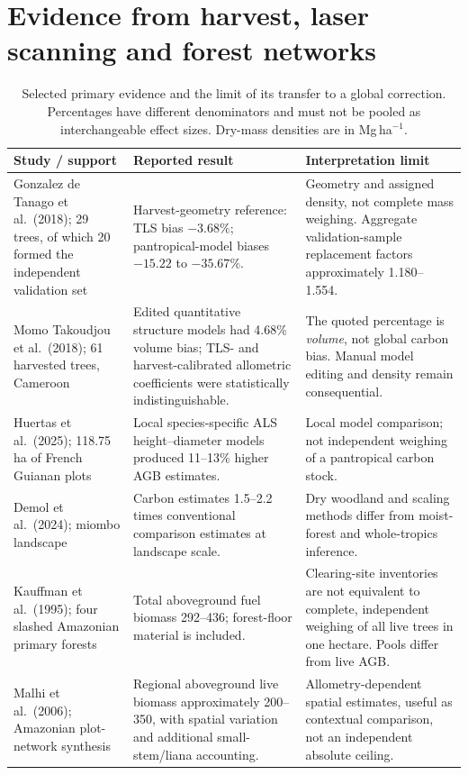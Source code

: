 \documentclass[11pt,a4paper]{article}
\theoremstyle{remark}
\begin{document}
\section{Evidence from harvest, laser scanning and forest networks}
\begin{table}[p]
\centering\small
\caption{Selected primary evidence and the limit of its transfer to a global correction. Percentages have different denominators and must not be pooled as interchangeable effect sizes. Dry-mass densities are in Mg\,ha$^{-1}$.}
\label{tab:evidence}
\begin{tabularx}{\textwidth}{@{}p{}p{}Y@{}}
\toprule
Study / support & Reported result & Interpretation limit\\
\midrule
Gonzalez de Tanago et al.\ (2018); 29 trees, of which 20 formed the independent validation set & Harvest-geometry reference: TLS bias $-3.68\%$; pantropical-model biases $-15.22$ to $-35.67\%$. & Geometry and assigned density, not complete mass weighing. Aggregate validation-sample replacement factors approximately 1.180--1.554.\\[.6em]
Momo Takoudjou et al.\ (2018); 61 harvested trees, Cameroon & Edited quantitative structure models had 4.68\% volume bias; TLS- and harvest-calibrated allometric coefficients were statistically indistinguishable. & The quoted percentage is \emph{volume}, not global carbon bias. Manual model editing and density remain consequential.\\[.6em]
Huertas et al.\ (2025); 118.75 ha of French Guianan plots & Local species-specific ALS height--diameter models produced 11--13\% higher AGB estimates. & Local model comparison; not independent weighing of a pantropical carbon stock.\\[.6em]
Demol et al.\ (2024); miombo landscape & Carbon estimates 1.5--2.2 times conventional comparison estimates at landscape scale. & Dry woodland and scaling methods differ from moist-forest and whole-tropics inference.\\[.6em]
Kauffman et al.\ (1995); four slashed Amazonian primary forests & Total aboveground fuel biomass 292--436; forest-floor material is included. & Clearing-site inventories are not equivalent to complete, independent weighing of all live trees in one hectare. Pools differ from live AGB.\\[.6em]
Malhi et al.\ (2006); Amazonian plot-network synthesis & Regional aboveground live biomass approximately 200--350, with spatial variation and additional small-stem/liana accounting. & Allometry-dependent spatial estimates, useful as contextual comparison, not an independent absolute ceiling.\\[.6em]

\end{tabularx}
\end{table}
\end{document}
